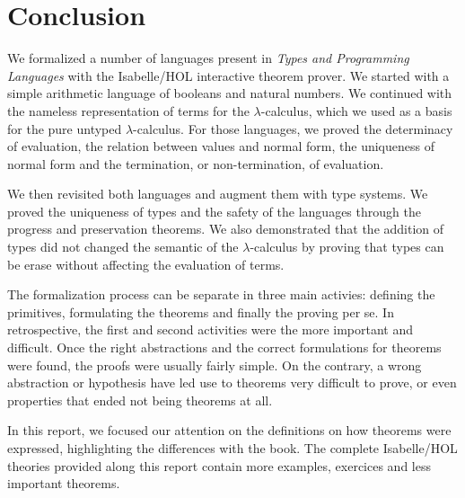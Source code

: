 \section{Conclusion}

We formalized a number of languages present in \emph{Types and Programming Languages} with the
Isabelle/HOL interactive theorem prover. We started with a simple arithmetic language of booleans
and natural numbers. We continued with the nameless representation of terms for the
$\lambda$-calculus, which we used as a basis for the pure untyped $\lambda$-calculus. For those
languages, we proved the determinacy of evaluation, the relation between values and normal form, the
uniqueness of normal form and the termination, or non-termination, of evaluation.

We then revisited both languages and augment them with type systems. We proved the uniqueness of
types and the safety of the languages through the progress and preservation theorems. We also
demonstrated that the addition of types did not changed the semantic of the $\lambda$-calculus by
proving that types can be erase without affecting the evaluation of terms.

The formalization process can be separate in three main activies: defining the primitives,
formulating the theorems and finally the proving per se. In retrospective, the first and second
activities were the more important and difficult. Once the right abstractions and the correct
formulations for theorems were found, the proofs were usually fairly simple. On the contrary, a
wrong abstraction or hypothesis have led use to theorems very difficult to prove, or even properties
that ended not being theorems at all.

In this report, we focused our attention on the definitions on how theorems were expressed,
highlighting the differences with the book. The complete Isabelle/HOL theories provided along this
report contain more examples, exercices and less important theorems.
